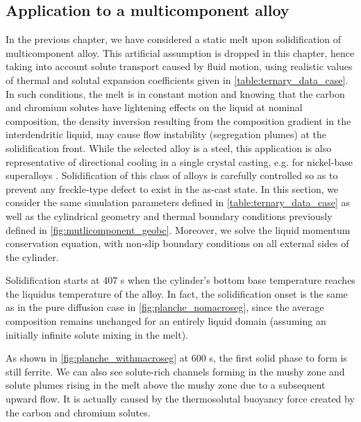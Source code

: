 \subsection{Application to a multicomponent alloy}

In the previous chapter, we have considered a static melt upon solidification of multicomponent alloy. 
This artificial assumption is dropped in this chapter, hence taking into account solute transport 
caused by fluid motion, using realistic values of thermal and solutal expansion coefficients given in \cref{table:ternary_data_case}.
In such conditions, the melt is in constant motion and knowing that the carbon and chromium solutes have lightening effects on the liquid 
at nominal composition, the density inversion resulting from the composition gradient in the interdendritic 
liquid, may cause flow instability (segregation plumes) at the solidification front. While the selected alloy 
is a steel, this application is also representative of directional cooling in a single crystal casting, e.g. 
for nickel-base superalloys \citep{beckermann_development_2000}. Solidification of this class of alloys is carefully
controlled so as to prevent any freckle-type defect to exist in the as-cast state.
In this section, we consider the same simulation parameters defined in \cref{table:ternary_data_case} as well as the cylindrical geometry and thermal boundary conditions
previously defined in \cref{fig:mutlicomponent_geobc}. Moreover, we solve the liquid momentum conservation equation, with non-slip boundary conditions
on all external sides of the cylinder.


Solidification starts at 407 s when the cylinder’s bottom base temperature 
reaches the liquidus temperature of the alloy. 
In fact, the solidification onset is the same as in the pure diffusion case in \cref{fig:planche_nomacroseg}, 
since the average composition remains unchanged for an entirely liquid domain (assuming an initially infinite 
solute mixing in the melt). 

As shown in \cref{fig:planche_withmacroseg} at 600 s, the first solid phase to form 
is still ferrite. We can also see solute-rich channels forming in the mushy zone and solute 
plumes rising in the melt above the mushy zone due to a subsequent upward flow. It is actually 
caused by the thermosolutal buoyancy force created by the carbon and chromium solutes. 

